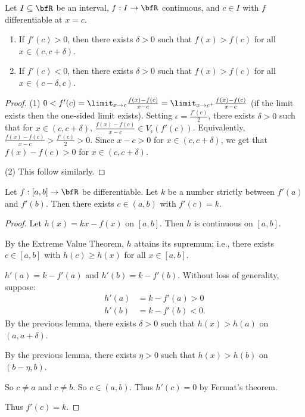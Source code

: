     \begin{lemma}
        Let $I\subseteq \bfR$ be an interval, $f:I \rightarrow \bfR$ continuous, and $c \in I$ with $f$ differentiable at $x=c$.
            \begin{enumerate}[label = (\arabic*)]
                \item If $f'(c) > 0$, then there exists $\delta > 0$ such that $f(x) > f(c)$ for all $x \in (c,c+\delta)$.
                \item If $f'(c) < 0$, then there exists $\delta > 0$ such that $f(x) > f(c)$ for all $x \in (c-\delta,c)$.
            \end{enumerate}
    \end{lemma}
        \begin{proof}
            (1) $0 < f'(c) = \limit_{x \rightarrow c}\frac{f(x) - f(c)}{x-c} = \limit_{x \rightarrow c^+}\frac{f(x) - f(c)}{x-c}$ (if the limit exists then the one-sided limit exists). Setting $\epsilon = \frac{f'(c)}{2}$, there exists $\delta > 0$ such that for $x \in (c,c+\delta)$, $\frac{f(x) - f(c)}{x-c} \in V_\epsilon(f'(c))$. Equivalently, $\frac{f(x)-f(c)}{x-c} > \frac{f'(c)}{2} > 0$. Since $x-c > 0$ for $x \in (c,c+\delta)$, we get that $f(x) - f(c) > 0$ for $x \in (c,c+\delta)$. \nl
            
            (2) This follow similarly.
        \end{proof}

    \begin{theorem}
        Let $f:[a,b] \rightarrow \bfR$ be differentiable. Let $k$ be a number strictly between $f'(a)$ and $f'(b)$. Then there exists $c \in (a,b)$ with $f'(c) = k$.
    \end{theorem}
        \begin{proof}
            Let $h(x) = kx - f(x)$ on $[a,b]$. Then $h$ is continuous on $[a,b]$. \nl
            
            By the Extreme Value Theorem, $h$ attains its supremum; i.e., there exists $c \in [a,b]$ with $h(c) \geq h(x)$ for all $x \in [a,b]$.\nl
            
            $h'(a) = k-f'(a)$ and $h'(b) = k-f'(b)$. Without loss of generality, suppose:
                \begin{equation*}
                \begin{split}
                    h'(a) &= k-f'(a) > 0 \\
                    h'(b) &= k-f'(b) < 0.
                \end{split}
                \end{equation*}
            By the previous lemma, there exists $\delta > 0$ such that $h(x) > h(a)$ on $(a,a + \delta)$. \nl
            
            By the previous lemma, there exists $\eta  > 0$ such that $h(x) > h(b)$ on $(b - \eta,b)$. \nl
            
            So $c \neq a$ and $c \neq b$. So $c \in (a,b)$. Thus $h'(c) = 0$ by Fermat's theorem. \nl
            
            Thus $f'(c) = k$.
        \end{proof}

